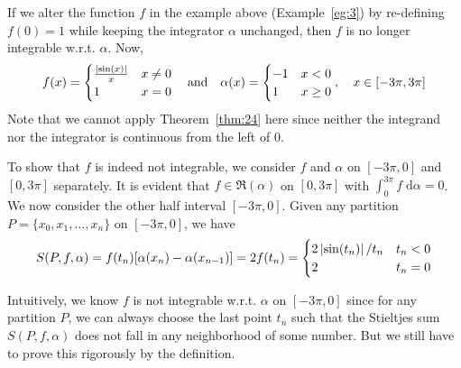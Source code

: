 \documentclass[thmcnt=section, 12pt]{my-elegantbook}
\begin{document}
\begin{example}
    If we alter the function $f$ in the example above (Example~\ref{eg:3}) by re-defining $f(0) = 1$ while keeping the integrator $\alpha$ unchanged, then $f$ is no longer integrable w.r.t. $\alpha$. Now,
    \begin{align*}
        f(x) = \begin{cases}
                   \frac{\left\lvert \sin(x) \right\rvert}{x} & x \neq 0 \\
                   1                       & x = 0
               \end{cases}
        \quad\text{and}\quad
        \alpha(x) = \begin{cases}
                        -1 & x < 0    \\
                        1  & x \geq 0
                    \end{cases},
        \quad x \in [-3\pi, 3\pi]
    \end{align*}
    Note that we cannot apply Theorem~\ref{thm:24} here since neither the integrand nor the integrator is continuous from the left of $0$.

    To show that $f$ is indeed not integrable, we consider $f$ and $\alpha$ on $[-3\pi, 0]$ and $[0, 3\pi]$ separately. It is evident that $f \in \mathfrak{R}(\alpha)$ on $[0, 3\pi]$ with $\int_{0}^{3\pi}f \; \mathrm{d}\alpha = 0$. We now consider the other half interval $[-3\pi, 0]$. Given any partition $P = \{x_0, x_1, \ldots, x_n\}$ on $[-3\pi, 0]$, we have
    \begin{align*}
        S(P,f,\alpha)
        = f(t_n) [\alpha(x_n) - \alpha(x_{n-1})]
        = 2 f(t_n)
        = \begin{cases}
              2 \left\lvert \sin(t_n) \right\rvert / t_n & t_n < 0 \\
              2                       & t_n = 0
          \end{cases}
    \end{align*}

    \begin{note}
        Intuitively, we know $f$ is not integrable w.r.t. $\alpha$ on $[-3\pi, 0]$ since for any partition $P$, we can always choose the last point $t_n$ such that the Stieltjes sum $S(P,f,\alpha)$ does not fall in any neighborhood of some number. But we still have to prove this rigorously by the definition.
    \end{note}


\end{example}
\end{document}
